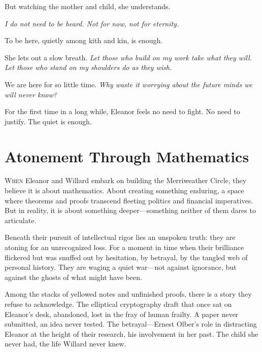 \smallskip

But watching the mother and child, she understands.

\textit{I do not need to be heard. Not for now, not for eternity.} 

\smallskip

To be here, quietly among kith and kin, is enough.

\smallskip

She lets out a slow breath. \textit{Let those who build on my work take what they will. Let those who stand on my shoulders do as they wish.} 

\smallskip

We are here for so little time. \textit{Why waste it worrying about the future minds we will never know?}

\smallskip

For the first time in a long while, Eleanor feels no need to fight. No need to justify. The quiet is enough.

\newpage

\section*{Atonement Through Mathematics}

\lettrine{W}{hen} Eleanor and Willard embark on building the Merriweather Circle, they believe it is about mathematics. About creating something enduring, a space where theorems and proofs transcend fleeting politics and financial imperatives. But in reality, it is about something deeper—something neither of them dares to articulate.

Beneath their pursuit of intellectual rigor lies an unspoken truth: they are atoning for an unrecognized loss. For a moment in time when their brilliance flickered but was snuffed out by hesitation, by betrayal, by the tangled web of personal history. They are waging a quiet war—not against ignorance, but against the ghosts of what might have been.


Among the stacks of yellowed notes and unfinished proofs, there is a story they refuse to acknowledge. The elliptical cryptography draft that once sat on Eleanor’s desk, abandoned, lost in the fray of human frailty. A paper never submitted, an idea never tested. The betrayal—Ernest Olber’s role in distracting Eleanor at the height of their research, his involvement in her past. The child she never had, the life Willard never knew.

